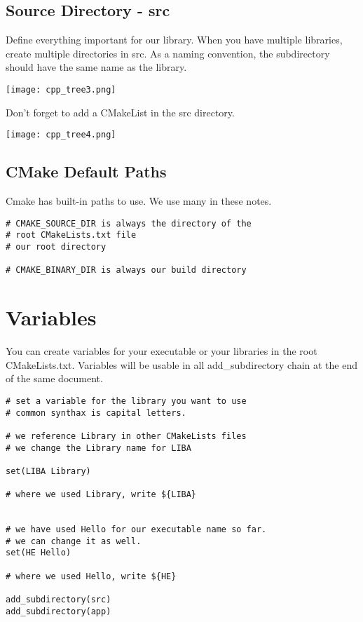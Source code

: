 \documentclass[openany]{report}
\begin{document}
\subsection{Source Directory - src}

Define everything important for our library. When you have multiple libraries, create multiple directories in
src. As a naming convention, the subdirectory should have the same name as the library.

\begin{center}
    \texttt{[image: cpp\_tree3.png]}
\end{center}

Don't forget to add a CMakeList in the src directory.


\begin{center}
    \texttt{[image: cpp\_tree4.png]}
\end{center}

\subsection{CMake Default Paths}

Cmake has built-in paths to use. We use many in these notes.

\begin{verbatim}
# CMAKE_SOURCE_DIR is always the directory of the
# root CMakeLists.txt file
# our root directory

# CMAKE_BINARY_DIR is always our build directory
\end{verbatim}

\section{Variables}

You can create variables for your executable or your libraries in the root CMakeLists.txt. Variables
will be usable in all add\_subdirectory chain at the end of the same document.

\begin{verbatim}
# set a variable for the library you want to use
# common synthax is capital letters.

# we reference Library in other CMakeLists files
# we change the Library name for LIBA

set(LIBA Library)

# where we used Library, write ${LIBA}


# we have used Hello for our executable name so far.
# we can change it as well.
set(HE Hello)

# where we used Hello, write ${HE}

add_subdirectory(src)
add_subdirectory(app)
\end{verbatim}
\end{document}
